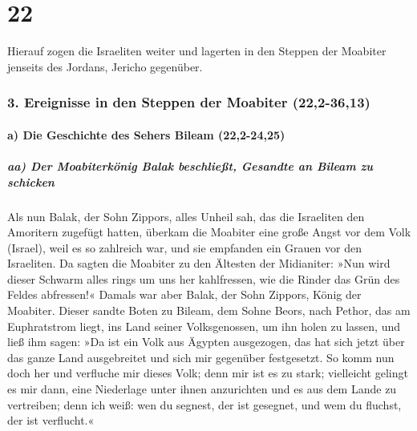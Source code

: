 \hypertarget{section-21}{%
\section{22}\label{section-21}}

Hierauf zogen die Israeliten weiter und lagerten in den
Steppen der Moabiter jenseits des Jordans, Jericho gegenüber.

\hypertarget{ereignisse-in-den-steppen-der-moabiter-222-3613}{%
\subsubsection{3. Ereignisse in den Steppen der Moabiter
(22,2-36,13)}\label{ereignisse-in-den-steppen-der-moabiter-222-3613}}

\hypertarget{a-die-geschichte-des-sehers-bileam-222-2425}{%
\paragraph{a) Die Geschichte des Sehers Bileam
(22,2-24,25)}\label{a-die-geschichte-des-sehers-bileam-222-2425}}

\hypertarget{aa-der-moabiterkuxf6nig-balak-beschlieuxdft-gesandte-an-bileam-zu-schicken}{%
\subparagraph{aa) Der Moabiterkönig Balak beschließt, Gesandte an Bileam
zu
schicken}\label{aa-der-moabiterkuxf6nig-balak-beschlieuxdft-gesandte-an-bileam-zu-schicken}}

Als nun Balak, der Sohn Zippors, alles Unheil sah, das die
Israeliten den Amoritern zugefügt hatten, überkam die
Moabiter eine große Angst vor dem Volk (Israel), weil es so zahlreich
war, und sie empfanden ein Grauen vor den Israeliten. Da
sagten die Moabiter zu den Ältesten der Midianiter: »Nun wird dieser
Schwarm alles rings um uns her kahlfressen, wie die Rinder das Grün des
Feldes abfressen!« Damals war aber Balak, der Sohn Zippors, König der
Moabiter. Dieser sandte Boten zu Bileam, dem Sohne Beors,
nach Pethor, das am Euphratstrom liegt, ins Land seiner Volksgenossen,
um ihn holen zu lassen, und ließ ihm sagen: »Da ist ein Volk aus Ägypten
ausgezogen, das hat sich jetzt über das ganze Land ausgebreitet und sich
mir gegenüber festgesetzt. So komm nun doch her und
verfluche mir dieses Volk; denn mir ist es zu stark; vielleicht gelingt
es mir dann, eine Niederlage unter ihnen anzurichten und es aus dem
Lande zu vertreiben; denn ich weiß: wen du segnest, der ist gesegnet,
und wem du fluchst, der ist verflucht.«

